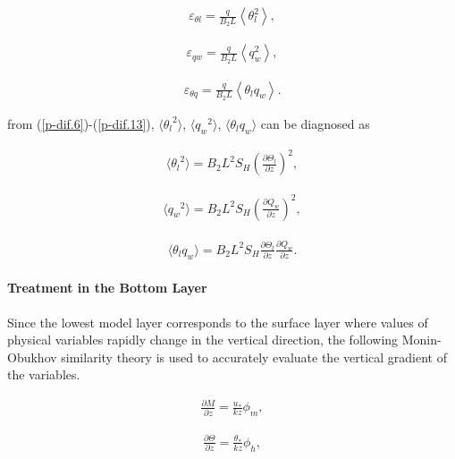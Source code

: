 \begin{eqnarray}
\varepsilon_{\theta l}=\frac{q}{B_{2} L}\left\langle\theta_{l}^{2}\right\rangle \label{p-dif.11},
\end{eqnarray}

\begin{eqnarray}
\varepsilon_{q w}=\frac{q}{B_{2} L}\left\langle q_{w}^{2}\right\rangle \label{p-dif.12},
\end{eqnarray}

\begin{eqnarray}
\varepsilon_{\theta q}=\frac{q}{B_{2} L}\left\langle\theta_{l} q_{w}\right\rangle \label{p-dif.13}.
\end{eqnarray}

from (\ref{p-dif.6})-(\ref{p-dif.13}), \(\langle {\theta_l}^2 \rangle\), \(\langle {q_w}^2 \rangle\), \(\langle \theta_l q_w \rangle\) can be diagnosed as

\begin{eqnarray}\langle {\theta_l}^2 \rangle =B_2L^2S_H\left(\frac{\partial \Theta_l}{\partial z}\right)^2,\end{eqnarray}

\begin{eqnarray}\langle {q_w}^2 \rangle =B_2L^2S_H\left(\frac{\partial Q_w}{\partial z}\right)^2,\end{eqnarray}

\begin{eqnarray}\langle \theta_l q_w \rangle =B_2L^2S_H\frac{\partial \Theta_l}{\partial z}\frac{\partial Q_w}{\partial z}.\end{eqnarray}

\hypertarget{treatment-in-the-bottom-layer}{%
\paragraph{Treatment in the Bottom Layer}\label{treatment-in-the-bottom-layer}}

Since the lowest model layer corresponds to the surface layer where values of physical variables rapidly change in the vertical direction, the following Monin-Obukhov similarity theory is used to
accurately evaluate the vertical gradient of the variables.

\begin{eqnarray} \frac{\partial M}{\partial z} = \frac{u_*}{kz}\phi_m \label{p-dif.14},\end{eqnarray}

\begin{eqnarray} \frac{\partial \Theta}{\partial z} = \frac{\theta_*}{kz}\phi_h \label{p-dif.15},\end{eqnarray}

